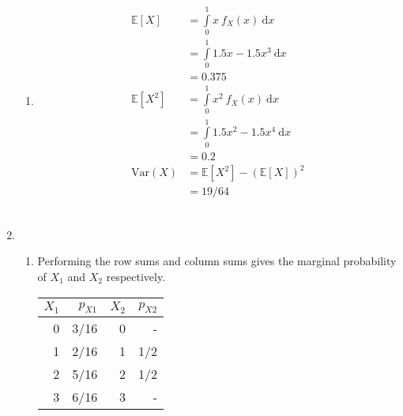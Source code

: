 \begin{enumerate}
\begin{enumerate}
			\item \begin{align}
				\mathbb{E}[X] &= \int\limits_{0}^{1} x\ f_X (x)\ \mathrm{d}x \nonumber \\
				&= \int\limits_{0}^{1} 1.5x - 1.5x^3\ \mathrm{d}x \nonumber \\
				&= 0.375 \\
				\mathbb{E}[X^2] &= \int\limits_{0}^{1} x^2\ f_X (x)\ \mathrm{d}x \nonumber \\
				&= \int\limits_{0}^{1} 1.5x^2 - 1.5x^4\ \mathrm{d}x \nonumber \\
				&= 0.2 \\
				\mathrm{Var}(X) &= \mathbb{E}[X^2]- (\mathbb{E}[X])^2 \nonumber \\
				&= 19/64
			\end{align} \\
		\end{enumerate}
	
	
	\item 
		\begin{enumerate}
			\item Performing the row sums and column sums gives the marginal probability of $ X_1 $ and $ X_2 $ respectively.
			
			\begin{table}[H]
				\centering
				\begin{tabular}{@{}rr|rr@{}}
					\toprule
					$ X_1 $ & $ p_{X1} $ & $ X_2 $ & $ p_{X2} $ \\ \midrule
					0     & 3/16	& 0	 & - 	 \\
					1     & 2/16    & 1	 & 1/2 	 \\
					2     & 5/16    & 2	 & 1/2 	 \\
					3     & 6/16    & 3	 & - 	 \\ \bottomrule
				\end{tabular}
			\end{table}
			

\end{enumerate}
\end{enumerate}
